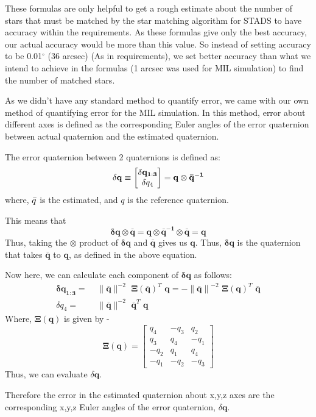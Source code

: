 \documentclass[../../main.tex]{subfiles}
\begin{document}
{{These formulas are only helpful to get a rough estimate about the number of stars that must be matched by the star matching algorithm for STADS to have accuracy within the requirements. As these formulas give only the best accuracy, our actual accuracy would be more than this value. So instead of setting accuracy to be 0.01$^\circ$ (36 arcsec) (As in requirements), we set better accuracy than what we intend to achieve in the formulas (1 arcsec was used for MIL simulation) to find the number of matched stars.

As we didn't have any standard method to quantify error, we came with our own method of quantifying error for the MIL simulation. In this method, error about different axes is defined as the corresponding Euler angles of the error quaternion between actual quaternion and the estimated quaternion.

The error quaternion between 2 quaternions is defined as:
\begin{equation}
    \delta \mathbf{q} \equiv \begin{bmatrix} \mathbf{\delta q_{1:3}} \\ \delta  q_4 \end{bmatrix} = \mathbf{q \otimes \Bar{q}^{-1}}
\end{equation}
where, $\Bar{q}$ is the estimated, and $q$ is the reference quaternion. 

This means that
\begin{equation}
\label{eqn:2}
    \mathbf{\delta q \otimes \bar{q} = q \otimes \bar{q}^{-1} \otimes \bar{q} = q}
\end{equation}
Thus, taking the $\otimes$ product of $\mathbf{\delta q}$ and $\mathbf{\bar{q}}$ gives us $\mathbf{q}$. Thus, $\mathbf{\delta q}$ is the quaternion that takes $\mathbf{\bar{q}}$ to $\mathbf{q}$, as defined in the above equation.

Now here, we can calculate each component of $\mathbf{\delta q}$ as follows:
\begin{align}
     \mathbf{\delta q_{1:3}} = & \,\, \| \mathbf{\bar{q}} \|^{-2} \,\, \mathbf{\Xi(\bar{q})}^T \,\, \mathbf{q = - \| \bar{q} \|}^{-2} \,\, \mathbf{\Xi(q)}^T \,\, \mathbf{\bar{q}} \\ 
     \delta q_4 = & \,\, \| \mathbf{\bar{q}} \|^{-2} \,\, \mathbf{\bar{q}}^T \,\, \mathbf{q}
\end{align}
Where, $\mathbf{\Xi}(\mathbf{q})$ is given by -
\begin{equation}
    \mathbf{\Xi}(\mathbf{q}) = \begin{bmatrix} q_4 & -q_3 & q_2 \\ q_3 & q_4 & -q_1 \\ -q_2 & q_1 & q_4 \\ -q_1 & -q_2 & -q_3 \end{bmatrix}
\end{equation}
Thus, we can evaluate $\delta \mathbf{q}$. 

Therefore the error in the estimated quaternion about x,y,z axes are the corresponding x,y,z Euler angles of the error quaternion, $\delta \mathbf{q}$.

}


}
\end{document}
